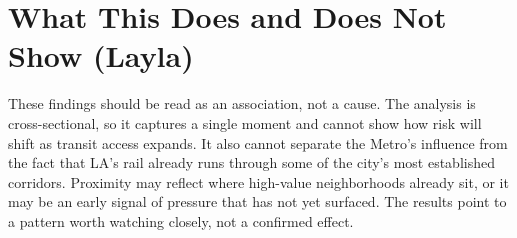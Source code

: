 \documentclass[11pt, letterpaper]{article}
\begin{document}
\section{What This Does and Does Not Show (Layla)}

These findings should be read as an association, not a cause. The analysis is cross-sectional, so it
captures a single moment and cannot show how risk will shift as transit access expands. It also
cannot separate the Metro's influence from the fact that LA's rail already runs through some of the
city's most established corridors. Proximity may reflect where high-value neighborhoods already sit,
or it may be an early signal of pressure that has not yet surfaced. The results point to a pattern
worth watching closely, not a confirmed effect.
\end{document}

